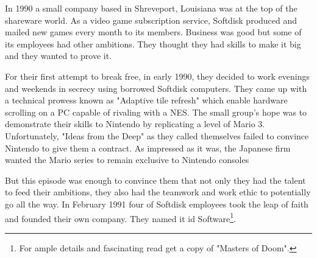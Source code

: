 \documentclass[book.tex]{subfiles}
\begin{document}
In 1990 a small company based in Shreveport, Louisiana was at the top of the shareware world. As a video game subscription service, Softdisk produced and mailed new games every month to its members. Business was good but some of its employees had other ambitions. They thought they had skills to make it big and they wanted to prove it.\\
\par
For their first attempt to break free, in early 1990, they decided to work evenings and weekends in secrecy using borrowed Softdisk computers. They came up with a technical prowess known as "Adaptive tile refresh" which enable hardware scrolling on a PC capable of rivaling with a NES. The small group's hope was to demonstrate their skills to Nintendo by replicating a level of Mario 3. Unfortunately, "Ideas from the Deep" as they called themselves failed to convince Nintendo to give them a contract. As impressed as it was, the Japanese firm wanted the Mario series to remain exclusive to Nintendo consoles \\
\par
But this episode was enough to convince them that not only they had the talent to feed their ambitions, they also had the teamwork and work ethic to potentially go all the way. In February 1991 four of Softdisk employees took the leap of faith and founded their own company. They named it id Software\footnote{For ample details and fascinating read get a copy of "Masters of Doom".}. 
\end{document}
